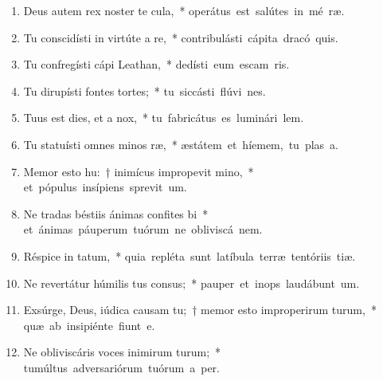 \begin{flushleft}
\begin{enumerate}[leftmargin=*]
\item Deus autem rex noster te cula,~* \mbox{operátus est salútes in mé ræ.}

\item Tu conscidísti in virtúte a re,~* \mbox{contribulásti cápita dracó  quis.}

\item Tu confregísti cápi Leathan,~* \mbox{dedísti eum escam  ris.}

\item Tu dirupísti fontes  tortes;~* \mbox{tu siccásti flúvi nes.}

\item Tuus est dies, et a  nox,~* \mbox{tu fabricátus es luminári  lem.}

\item Tu statuísti omnes minos ræ,~* \mbox{æstátem et híemem, tu plas a.}

\item Memor esto hu:~† inimícus impropevit mino,~* \mbox{et pópulus insípiens sprevit  um.}

\item Ne tradas béstiis ánimas confites bi~* \mbox{et ánimas páuperum tuórum ne obliviscá  nem.}

\item Réspice in tatum,~* \mbox{quia repléta sunt latíbula terræ tentóriis tiæ.}

\item Ne revertátur húmilis tus consus;~* \mbox{pauper et inops laudábunt  um.}

\item Exsúrge, Deus, iúdica causam tu;~† memor esto improperirum turum,~* \mbox{quæ ab insipiénte fiunt  e.}

\item Ne obliviscáris voces inimirum turum;~* \mbox{tumúltus adversariórum tuórum a per.}



\end{enumerate}
\end{flushleft}

